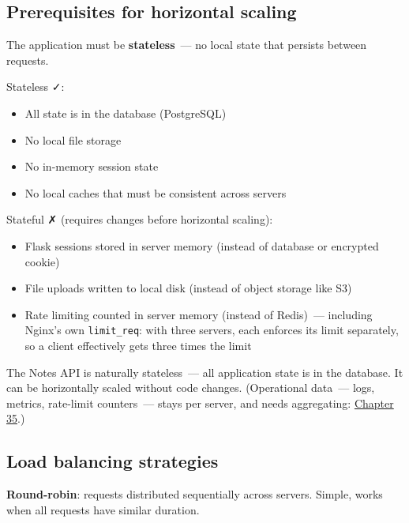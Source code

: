\subsection*{Prerequisites for horizontal scaling}\label{36-scaling-load:prerequisites-for-horizontal-scaling}

The application must be \textbf{stateless}~--- no local state that persists between requests.

Stateless ✓:

\begin{itemize}
\tightlist
\item
  All state is in the database (PostgreSQL)
\item
  No local file storage
\item
  No in-memory session state
\item
  No local caches that must be consistent across servers
\end{itemize}

\noindent{}Stateful ✗ (requires changes before horizontal scaling):

\begin{itemize}
\tightlist
\item
  Flask sessions stored in server memory (instead of database or encrypted cookie)
\item
  File uploads written to local disk (instead of object storage like S3)
\item
  Rate limiting counted in server memory (instead of Redis)~--- including Nginx's own \texttt{limit\_req}: with three servers, each enforces its limit separately, so a client effectively gets three times the limit
\end{itemize}

\noindent{}The Notes API is naturally stateless~--- all application state is in the database. It can be horizontally scaled without code changes. (Operational data~--- logs, metrics, rate-limit counters~--- stays per server, and needs aggregating: \hyperref[ch:35-observability]{Chapter 35}.)

\subsection*{Load balancing strategies}\label{36-scaling-load:load-balancing-strategies}

\textbf{Round-robin}: requests distributed sequentially across servers. Simple, works when all requests have similar duration.

